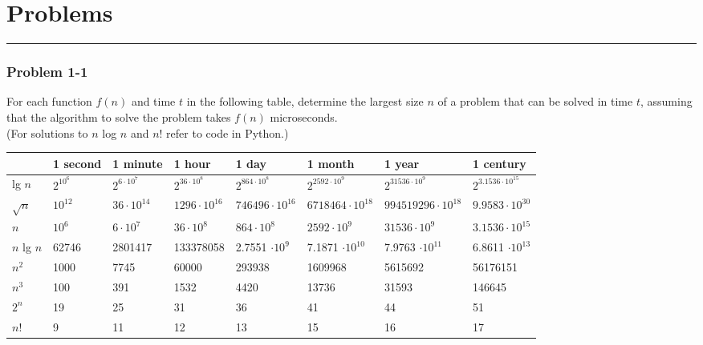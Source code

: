 \documentclass[10pt]{article}
\begin{document}
\section*{Problems}\nointerlineskip
\noindent \rule{\linewidth}{0.01pt}
\subsubsection*{Problem 1-1}

For each function $f(n)$ and time $t$ in the following table, determine the largest size $n$ of a problem that can be solved in time $t$, assuming that the algorithm to solve the problem takes $f(n)$ microseconds.\\

(For solutions to $n$ log $n$ and $n$! refer to code in Python.)\\

 \noindent \begin{tabular}{|p{.8cm}|p{1.4cm}|p{1.6cm}|p{1.8cm}|p{1.8cm}|p{2cm}|p{1.8cm}|p{2.4cm}|}
\hline
 & 1 second & 1 minute & 1 hour & 1 day & 1 month &	1 year & 1 century \\
 \hline
 lg $n$ & $2^{10^6}$ & $2^{6\cdot10^7}$ & $2^{36\cdot10^8}$ & $2^{864\cdot10^{8}}$ & $2^{2592\cdot10^{9}}$ & $2^{31536\cdot10^{9}}$ & $2^{3.1536\cdot10^{15}}$ \\\hline
 $\sqrt{n}$ & $10^{12}$ & $36\cdot10^{14}$ & $1296\cdot10^{16}$ & $746496\cdot10^{16}$ & $6718464\cdot10^{18}$ & $994519296\cdot10^{18}$ & \small $9.9583\cdot10^{30}$\\\hline
$n$ & $10^6$ & $6\cdot10^7$& $36\cdot10^8$ & $864\cdot10^8$ & $2592\cdot10^9$ & $31536\cdot10^9 $& $3.1536\cdot10^{15}$ \\\hline
\small $n$ lg $n$ &  62746  &  2801417 &  \small 133378058 
& \small 2.7551 $\cdot 10^{9}$ 
& \small 7.1871 $\cdot 10^{10}$
& \small 7.9763 $\cdot 10^{11}$
& \small 6.8611 $\cdot 10^{13}$
\\\hline
$n^2$ & 1000 & 7745 & 60000 & 293938 & 1609968 &  5615692 &  56176151 \\\hline
$n^3$ & 100 & 391 & 1532 & 4420 & 13736 & 31593 & 146645 \\\hline
$2^n$ & 19 & 25 & 31 & 36 & 41 & 44 & 51 \\\hline
$n!$ & 9 & 11 & 12 & 13 & 15 & 16 & 17 \\\hline
\end{tabular}\\
\end{document}

